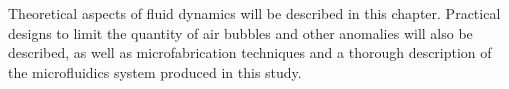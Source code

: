 Theoretical aspects of fluid dynamics will be described in this chapter. Practical designs to limit the quantity of air bubbles and other anomalies will also be described, as well as microfabrication techniques and a thorough description of the microfluidics system produced in this study.